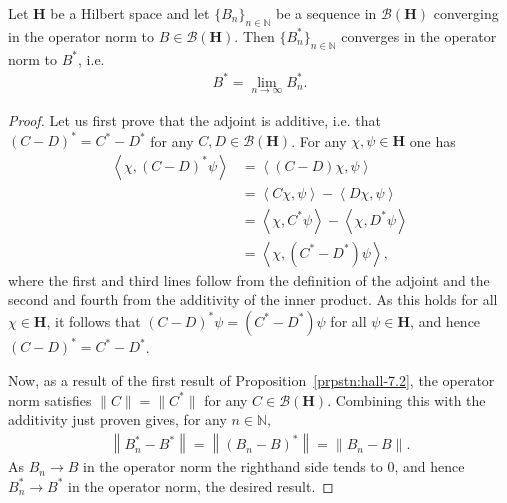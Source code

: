 \begin{proposition}
    \label{prpstn:continuity-of-the-adjoint}
    \leanok
    Let $\mathbf{H}$ be a Hilbert space and let $\{ B_n \}_{n \in \mathbb{N}}$ be a sequence in $\mathcal{B}(\mathbf{H})$ converging in the operator norm to $B \in \mathcal{B}(\mathbf{H})$. Then $\{ B_n^* \}_{n \in \mathbb{N}}$ converges in the operator norm to $B^*$, i.e.
    \begin{align}
        B^* = \lim\limits_{n \rightarrow \infty} B_n^*.
    \end{align}
\end{proposition}
\begin{proof}
    \leanok
Let us first prove that the adjoint is additive, i.e. that $(C - D)^* = C^* - D^*$ for any $C, D \in \mathcal{B}(\mathbf{H})$. For any $\chi, \psi \in \mathbf{H}$ one has
\begin{align}
    \left< \chi, (C - D)^* \psi \right> &= \left< (C - D)\chi, \psi \right> \\
                                        &= \left< C\chi, \psi \right> - \left< D\chi, \psi \right> \\
                                        &= \left< \chi, C^* \psi \right> - \left< \chi, D^* \psi \right> \\
                                        &= \left< \chi, (C^* - D^*) \psi \right>,
\end{align}
where the first and third lines follow from the definition of the adjoint and the second and fourth from the additivity of the inner product. As this holds for all $\chi \in \mathbf{H}$, it follows that $(C - D)^* \psi = (C^* - D^*)\psi$ for all $\psi \in \mathbf{H}$, and hence $(C - D)^* = C^* - D^*$.

Now, as a result of the first result of Proposition~\ref{prpstn:hall-7.2}, the operator norm satisfies $\|C\| = \|C^*\|$ for any $C \in \mathcal{B}(\mathbf{H})$. Combining this with the additivity just proven gives, for any $n \in \mathbb{N}$,
\begin{align}
    \left\| B_n^* - B^* \right\| = \left\| (B_n - B)^* \right\| = \left\| B_n - B \right\|.
\end{align}
As $B_n \rightarrow B$ in the operator norm the righthand side tends to $0$, and hence $B_n^* \rightarrow B^*$ in the operator norm, the desired result.
\end{proof}

